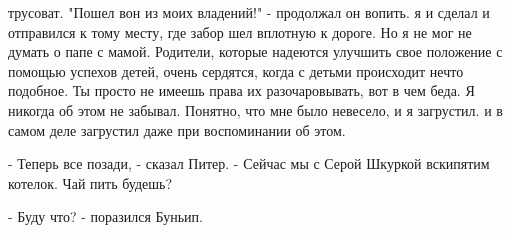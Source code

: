 трусоват. "Пошел вон из моих владений!" - продолжал он вопить.
 я и сделал и отправился к тому месту, где забор шел вплотную к 
дороге. Но я не мог не думать о папе с мамой. Родители, которые 
надеются улучшить свое положение с помощью успехов детей, очень 
сердятся, когда с детьми происходит нечто подобное. Ты просто не 
имеешь права их разочаровывать, вот в чем беда. Я никогда об этом не 
забывал. Понятно, что мне было невесело, и я загрустил.
 и в самом деле загрустил даже при воспоминании об этом.
\par- Теперь все позади, - сказал Питер. - Сейчас мы с Серой Шкуркой 
вскипятим котелок. Чай пить будешь?
\par- Буду что? - поразился Буньип.
\par
